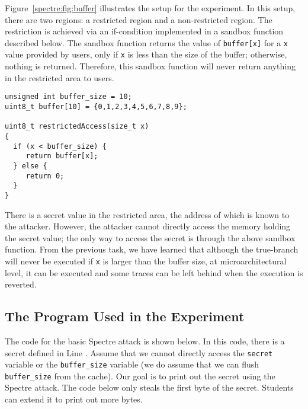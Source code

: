 Figure~\ref{spectre:fig:buffer} illustrates the setup for the experiment. 
In this setup, there are two regions: a restricted region and a non-restricted region. 
The restriction is achieved via an if-condition implemented in a sandbox function
described below. The sandbox function returns the value of \texttt{buffer[x]} for a \texttt{x} 
value provided by users, only if \texttt{x} is less than the 
size of the buffer; otherwise, nothing is returned. Therefore, this sandbox function 
will never return anything in the restricted area to users.


\begin{lstlisting}
unsigned int buffer_size = 10;
uint8_t buffer[10] = {0,1,2,3,4,5,6,7,8,9};

uint8_t restrictedAccess(size_t x) 
{
  if (x < buffer_size) {   
     return buffer[x];
  } else {
     return 0;
  }
} 
\end{lstlisting}


There is a secret value in the restricted area, the address of which 
is known to the attacker. However, the attacker cannot directly 
access the memory holding the secret value; the only way to access the 
secret is through the above sandbox function. From the previous task, we have learned that
although the true-branch will never be executed if \texttt{x} is larger than the buffer size,
at microarchitectural level, it can be executed and some traces can be left behind
when the execution is reverted. 


\subsection{The Program Used in the Experiment}


The code for the basic Spectre attack is shown below. In this code, there is a
secret defined in Line . Assume that we cannot directly
access the \texttt{secret} variable or the \texttt{buffer\_size} variable (we do assume that we
can flush \texttt{buffer\_size} from the cache). Our goal is to print out the secret
using the Spectre attack. The code below only steals the first byte of the secret. Students can
extend it to print out more bytes. 


